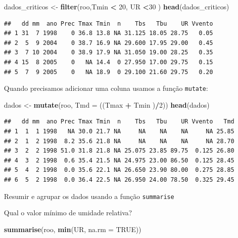 \documentclass[
]{book}
\newenvironment{Shaded}{\begin{snugshade}}{\end{snugshade}}
\newcommand{\DataTypeTok}[1]{\textcolor[rgb]{0.13,0.29,0.53}{#1}}
\newcommand{\DecValTok}[1]{\textcolor[rgb]{0.00,0.00,0.81}{#1}}
\newcommand{\KeywordTok}[1]{\textcolor[rgb]{0.13,0.29,0.53}{\textbf{#1}}}
\newcommand{\NormalTok}[1]{#1}
\newcommand{\OperatorTok}[1]{\textcolor[rgb]{0.81,0.36,0.00}{\textbf{#1}}}
\newcommand{\OtherTok}[1]{\textcolor[rgb]{0.56,0.35,0.01}{#1}}
\newcommand{\StringTok}[1]{\textcolor[rgb]{0.31,0.60,0.02}{#1}}
\begin{document}
\begin{Shaded}
\begin{Highlighting}[]
\NormalTok{dados_criticos <-}\StringTok{ }\KeywordTok{filter}\NormalTok{(roo,Tmin }\OperatorTok{<}\StringTok{ }\DecValTok{20}\NormalTok{, UR }\OperatorTok{<}\DecValTok{30}\NormalTok{ )}
\KeywordTok{head}\NormalTok{(dados_criticos)}
\end{Highlighting}
\end{Shaded}

\begin{verbatim}
##   dd mm  ano Prec Tmax Tmin  n    Tbs   Tbu    UR Vvento
## 1 31  7 1998    0 36.8 13.8 NA 31.125 18.05 28.75   0.05
## 2  5  9 2004    0 38.7 16.9 NA 29.600 17.95 29.00   0.45
## 3  7 10 2004    0 38.9 17.9 NA 31.050 19.00 28.25   0.35
## 4 15  8 2005    0   NA 14.4  0 27.950 17.00 29.75   0.15
## 5  7  9 2005    0   NA 18.9  0 29.100 21.60 29.75   0.20
\end{verbatim}

Quando precisamos adicionar uma coluna usamos a função \texttt{mutate}:

\begin{Shaded}
\begin{Highlighting}[]
\NormalTok{dados <-}\StringTok{ }\KeywordTok{mutate}\NormalTok{(roo, }\DataTypeTok{Tmd =}\NormalTok{ ((Tmax }\OperatorTok{+}\StringTok{ }\NormalTok{Tmin )}\OperatorTok{/}\DecValTok{2}\NormalTok{))}
\KeywordTok{head}\NormalTok{(dados)}
\end{Highlighting}
\end{Shaded}

\begin{verbatim}
##   dd mm  ano Prec Tmax Tmin  n    Tbs   Tbu    UR Vvento   Tmd
## 1  1  1 1998   NA 30.0 21.7 NA     NA    NA    NA     NA 25.85
## 2  1  2 1998  8.2 35.6 21.8 NA     NA    NA    NA     NA 28.70
## 3  2  2 1998 51.0 31.8 21.8 NA 25.075 23.85 89.75  0.125 26.80
## 4  3  2 1998  0.6 35.4 21.5 NA 24.975 23.00 86.50  0.125 28.45
## 5  4  2 1998  0.0 35.6 22.1 NA 26.650 23.90 80.00  0.275 28.85
## 6  5  2 1998  0.0 36.4 22.5 NA 26.950 24.00 78.50  0.325 29.45
\end{verbatim}

Resumir e agrupar os dados usando a função \texttt{summarise}

Qual o valor mínimo de umidade relativa?

\begin{Shaded}
\begin{Highlighting}[]
\KeywordTok{summarise}\NormalTok{(roo, }\KeywordTok{min}\NormalTok{(UR, }\DataTypeTok{na.rm =} \OtherTok{TRUE}\NormalTok{)) }
\end{Highlighting}
\end{Shaded}
\end{document}
